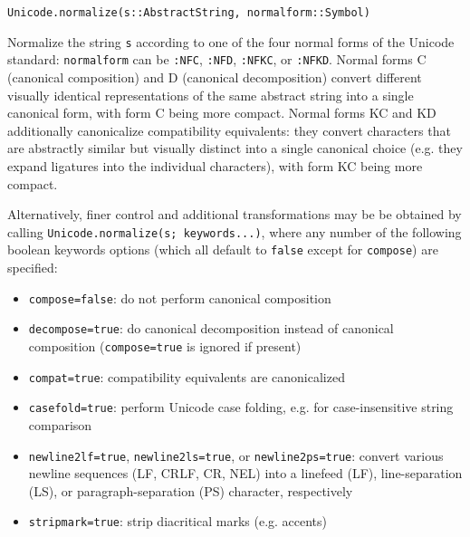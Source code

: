 \begin{adjustwidth}{2em}{0pt}


\begin{verbatim}
Unicode.normalize(s::AbstractString, normalform::Symbol)
\end{verbatim}

Normalize the string \texttt{s} according to one of the four {\textquotedbl}normal forms{\textquotedbl} of the Unicode standard: \texttt{normalform} can be \texttt{:NFC}, \texttt{:NFD}, \texttt{:NFKC}, or \texttt{:NFKD}.  Normal forms C (canonical composition) and D (canonical decomposition) convert different visually identical representations of the same abstract string into a single canonical form, with form C being more compact.  Normal forms KC and KD additionally canonicalize {\textquotedbl}compatibility equivalents{\textquotedbl}: they convert characters that are abstractly similar but visually distinct into a single canonical choice (e.g. they expand ligatures into the individual characters), with form KC being more compact.

Alternatively, finer control and additional transformations may be be obtained by calling \texttt{Unicode.normalize(s; keywords...)}, where any number of the following boolean keywords options (which all default to \texttt{false} except for \texttt{compose}) are specified:

\begin{itemize}
\item \texttt{compose=false}: do not perform canonical composition


\item \texttt{decompose=true}: do canonical decomposition instead of canonical composition (\texttt{compose=true} is ignored if present)


\item \texttt{compat=true}: compatibility equivalents are canonicalized


\item \texttt{casefold=true}: perform Unicode case folding, e.g. for case-insensitive string comparison


\item \texttt{newline2lf=true}, \texttt{newline2ls=true}, or \texttt{newline2ps=true}: convert various newline sequences (LF, CRLF, CR, NEL) into a linefeed (LF), line-separation (LS), or paragraph-separation (PS) character, respectively


\item \texttt{stripmark=true}: strip diacritical marks (e.g. accents)



\end{itemize}
\end{adjustwidth}
